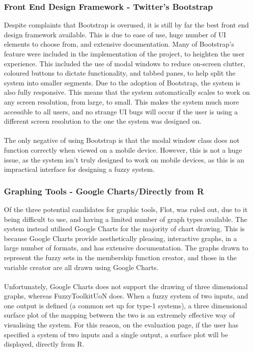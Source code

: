 \tocless\subsubsection{Front End Design Framework - Twitter's Bootstrap}
Despite complaints that Bootstrap is overused, it is still by far the best front end design framework available. This is due to ease of use, huge number of UI elements to choose from, and extensive documentation. Many of Bootstrap's feature were included in the implementation of the project, to heighten the user experience. This included the use of modal windows to reduce on-screen clutter, coloured buttons to dictate functionality, and tabbed panes, to help split the system into smaller segments. Due to the adoption of Bootstrap, the system is also fully responsive. This means that the system automatically scales to work on any screen resolution, from large, to small. This makes the system much more accessible to all users, and no strange UI bugs will occur if the user is using a different screen resolution to the one the system was designed on. \ \\
\ \\
The only negative of using Bootstrap is that the modal window class does not function correctly when viewed on a mobile device. However, this is not a huge issue, as the system isn't truly designed to work on mobile devices, as this is an impractical interface for designing a fuzzy system. 

\tocless\subsubsection{Graphing Tools - Google Charts/Directly from R}
Of the three potential candidates for graphic tools, Flot, was ruled out, due to it being difficult to use, and having a limited number of graph types available. The system instead utilised Google Charts for the majority of chart drawing. This is because Google Charts provide aesthetically pleasing, interactive graphs, in a large number of formats, and has extensive documentation. The graphs drawn to represent the fuzzy sets in the membership function creator, and those in the variable creator are all drawn using Google Charts.\ \\
\ \\
Unfortunately, Google Charts does not support the drawing of three dimensional graphs, whereas FuzzyToolkitUoN does. When a fuzzy system of two inputs, and one output is defined (a common set up for type-1 systems), a three dimensional surface plot of the mapping between the two is an extremely effective way of visualising the system. For this reason, on the evaluation page, if the user has specified a system of two inputs and a single output, a surface plot will be displayed, directly from R.

